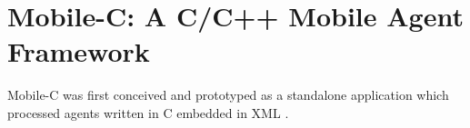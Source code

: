 \chapter{Mobile-C: A C/C++ Mobile Agent Framework}
Mobile-C was first conceived and prototyped as a standalone application which
processed agents written in C embedded in XML \cite{chen2005}. 
